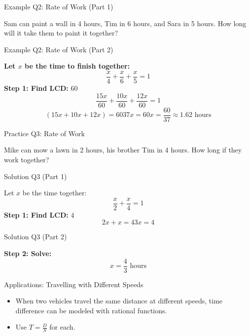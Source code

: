 \documentclass[aspectratio=169]{beamer}
\begin{document}
\begin{frame}{Example Q2: Rate of Work (Part 1)}
\begin{tcolorbox}[colback=lightgray,colframe=secondary,title=Example Q2 (Part 1)]
\footnotesize
Sam can paint a wall in 4 hours, Tim in 6 hours, and Sara in 5 hours. How long will it take them to paint it together?
\end{tcolorbox}
\end{frame}

\begin{frame}{Example Q2: Rate of Work (Part 2)}
\begin{tcolorbox}[colback=lightgray,colframe=secondary,title=Example Q2 (Part 2)]
\footnotesize
\textbf{Let $x$ be the time to finish together:}
\[
\frac{x}{4} + \frac{x}{6} + \frac{x}{5} = 1
\]
\textbf{Step 1: Find LCD:} $60$
\[
\frac{15x}{60} + \frac{10x}{60} + \frac{12x}{60} = 1
\]
\[
(15x + 10x + 12x) = 60
37x = 60
x = \frac{60}{37} \approx 1.62 \text{ hours}
\]
\end{tcolorbox}
\end{frame}

\begin{frame}{Practice Q3: Rate of Work}
\begin{tcolorbox}[colback=lightgray,colframe=primary,title=Practice Q3]
\footnotesize
Mike can mow a lawn in 2 hours, his brother Tim in 4 hours. How long if they work together?
\end{tcolorbox}
\end{frame}

\begin{frame}{Solution Q3 (Part 1)}
\begin{tcolorbox}[colback=lightgray,colframe=accent,title=Solution Q3 (Part 1)]
\footnotesize
Let $x$ be the time together:
\[
\frac{x}{2} + \frac{x}{4} = 1
\]
\textbf{Step 1: Find LCD:} $4$
\[
2x + x = 4
3x = 4
\]
\end{tcolorbox}
\end{frame}

\begin{frame}{Solution Q3 (Part 2)}
\begin{tcolorbox}[colback=lightgray,colframe=accent,title=Solution Q3 (Part 2)]
\footnotesize
\textbf{Step 2: Solve:}
\[
x = \frac{4}{3} \text{ hours}
\]
\end{tcolorbox}
\end{frame}

\begin{frame}{Applications: Travelling with Different Speeds}
\begin{tcolorbox}[colback=lightgray,colframe=primary,title=Key Concepts]
\footnotesize
\begin{itemize}
  \item When two vehicles travel the same distance at different speeds, time difference can be modeled with rational functions.
  \item Use $T = \frac{D}{S}$ for each.
\end{itemize}
\end{tcolorbox}
\end{frame}
\end{document}
